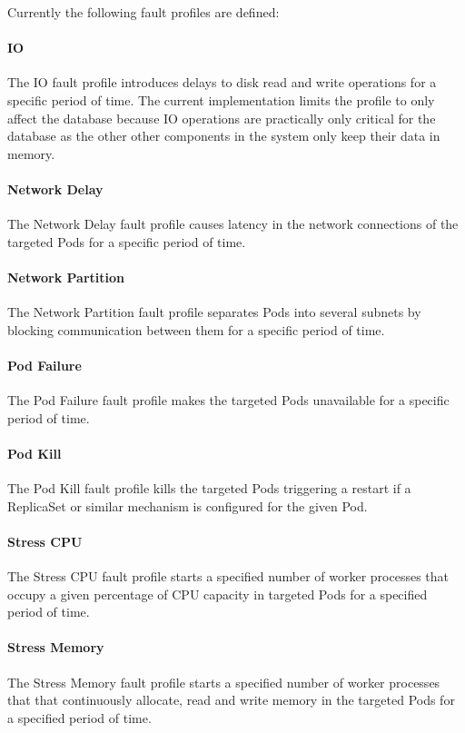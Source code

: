 Currently the following fault profiles are defined:

\paragraph{IO} The IO fault profile introduces delays to disk read and write operations for a specific period of time. The current implementation limits the profile to only affect the database because IO operations are practically only critical for the database as the other other components in the system only keep their data in memory.

\paragraph{Network Delay} The Network Delay fault profile causes latency in the network connections of the targeted Pods for a specific period of time.

\paragraph{Network Partition} The Network Partition fault profile separates Pods into several subnets by blocking communication between them for a specific period of time.

\paragraph{Pod Failure} The Pod Failure fault profile makes the targeted Pods unavailable for a specific period of time.

\paragraph{Pod Kill} The Pod Kill fault profile kills the targeted Pods triggering a restart if a ReplicaSet or similar mechanism is configured for the given Pod.

\paragraph{Stress CPU} The Stress CPU fault profile starts a specified number of worker processes that occupy a given percentage of CPU capacity in targeted Pods for a specified period of time.

\paragraph{Stress Memory} The Stress Memory fault profile starts a specified number of worker processes that that continuously allocate, read and write memory in the targeted Pods for a specified period of time.

